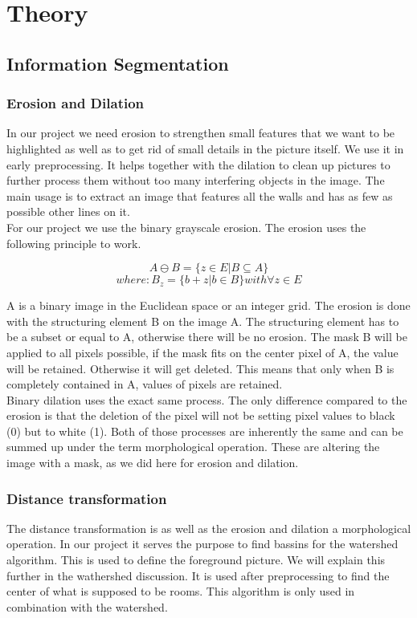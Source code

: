 \section{Theory}
\subsection{Information Segmentation}
\subsubsection{Erosion and Dilation}
In our project we need erosion to strengthen small features that we want to be highlighted as well as to get rid of small details in the picture itself. We use it in early preprocessing. It helps together with the dilation to clean up pictures to further process them without too many interfering objects in the image. The main usage is to extract an image that features all the walls and has as few as possible other lines on it. \cite{burger_burge_2016}
\\
For our project we use the binary grayscale erosion.
The erosion uses the following principle to work.


\[A \ominus B = \{ z\in E | B \subseteq A \}\]  
\[where: B_{z} = \{b+z | b \in B\} with \forall z \in E \]

A is a binary image in the Euclidean space or an integer grid. The erosion is done with the structuring element B on the image A. The structuring element has to be a subset or equal to A, otherwise there will be no erosion. The mask B will be applied to all pixels possible, if the mask fits on the center pixel of A, the value will be retained. Otherwise it will get deleted. This means that only when B is completely contained in A, values of pixels are retained.
\\
Binary dilation uses the exact same process. The only difference compared to the erosion is that the deletion of the pixel will not be setting pixel values to black (0) but to white (1). Both of those processes are inherently the same and can be summed up under the term morphological operation. These are altering the image with a mask, as we did here for erosion and dilation.




\subsubsection{Distance transformation}
The distance transformation is as well as the erosion and dilation a morphological operation. In our project it serves the purpose to find bassins for the watershed algorithm. This is used to define the foreground picture. We will explain this further in the wathershed discussion.
It is used after preprocessing to find the center of what is supposed to be rooms. This algorithm is only used in combination with the watershed.

